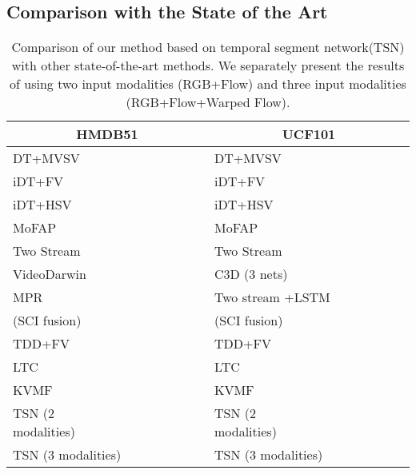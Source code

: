 \documentclass[runningheads]{llncs}
\newcommand{\SEGNET}{temporal segment network}
\begin{document}
\subsection{Comparison with the State of the Art}
\begin{table}[h]
	\small
	\centering
	\caption{Comparison of our method based on \SEGNET (TSN) with other state-of-the-art methods. We separately present the results of using two input modalities (RGB+Flow) and three input modalities (RGB+Flow+Warped Flow).}
	\begin{tabular}{|lr|lr|}
		\hline
		\multicolumn{2}{|c|}{HMDB51} & \multicolumn{2}{|c|}{UCF101} \\
		\hline
		\hline
		DT+MVSV \cite{CaiWPQ14} &  & DT+MVSV \cite{CaiWPQ14} &  \\
		iDT+FV \cite{WangS13a} &  & iDT+FV \cite{WangS13b} &  \\
		iDT+HSV \cite{PengWWQ14} &  & iDT+HSV \cite{PengWWQ14} &  \\
		MoFAP \cite{WangQT15b} &  & MoFAP \cite{WangQT15b} &  \\ 
		\hline
		\hline
		Two Stream \cite{SimonyanZ14} &  & Two Stream \cite{SimonyanZ14} &  \\
		VideoDarwin \cite{FernandoGMGT15} &  & C3D (3 nets) \cite{TranBFTP15} &  \\
		MPR \cite{NiMYY15} &  & Two stream +LSTM \cite{Ng15} &  \\
		 (SCI fusion) \cite{SunJYS15} &  &  (SCI fusion) \cite{SunJYS15} &  \\
		
		TDD+FV \cite{WangQT15a} &  & TDD+FV \cite{WangQT15a} &  \\
		LTC~\cite{varol} &  & LTC~\cite{varol} &  \\
		KVMF~\cite{ZhuW2016} &  & KVMF~\cite{ZhuW2016} &  \\
		\hline
		\hline
		TSN (2 modalities)~~~~~~~~~~~~~~~~ &  & TSN (2 modalities)~~~~~~~~~~~~~~~~ &   \\
		TSN (3 modalities) &  & TSN (3 modalities) & \\
		\hline
	\end{tabular}
	\label{tbl:stoa}
\end{table}
\end{document}
